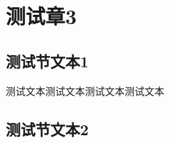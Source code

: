 \chapter{测试章3}

\section{测试节文本1} 

\zhlipsum[5]

测试文本测试文本测试文本测试文本


\section{测试节文本2}

\zhlipsum[6]


